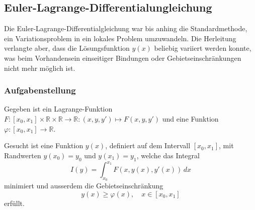 \subsection{Euler-Lagrange-Differentialungleichung
\label{buch:nebenbedingungen:einseitig:subsection:eldgl}}
Die Euler-Lagrange-Differentialgleichung war bis anhing die Standardmethode,
ein Variationsproblem in ein lokales Problem umzuwandeln.
Die Herleitung verlangte aber, dass die Lösungsfunktion $y(x)$ beliebig
variiert werden konnte, was beim Vorhandensein einseitiger Bindungen
oder Gebietseinschränkungen nicht mehr möglich ist.

%
%
\subsubsection{Aufgabenstellung}
Gegeben ist ein Lagrange-Funktion
$F\colon [x_0,x_1]\times\mathbb{R}\times\mathbb{R}\to\mathbb{R}:(x,y,y')\mapsto F(x,y,y')$ 
und eine Funktion $\varphi\colon[x_0,x_1]\to\mathbb{R}$.

\begin{aufgabe}
\label{buch:nebenbedingungen:einseitig:aufgabe}
Gesucht ist eine Funktion $y(x)$, definiert auf dem Intervall $[x_0,x_1]$,
mit Randwerten $y(x_0) = y_0$ und $y(x_1)=y_1$, welche das Integral
\[
I(y)
=
\int_{x_0}^{x_1} F(x,y(x),y'(x))\,dx
\]
minimiert und ausserdem die Gebietseinschränkung
\[
y(x) \ge \varphi(x), \quad x\in[x_0,x_1]
\]
erfüllt.
\end{aufgabe}

%
%
